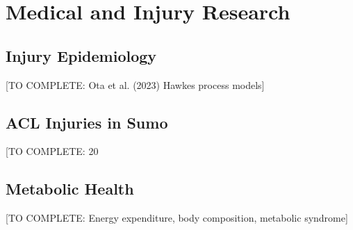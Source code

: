 \section{Medical and Injury Research}

\subsection{Injury Epidemiology}

[TO COMPLETE: Ota et al. (2023) Hawkes process models]

\subsection{ACL Injuries in Sumo}

[TO COMPLETE: 20%

\subsection{Metabolic Health}

[TO COMPLETE: Energy expenditure, body composition, metabolic syndrome]